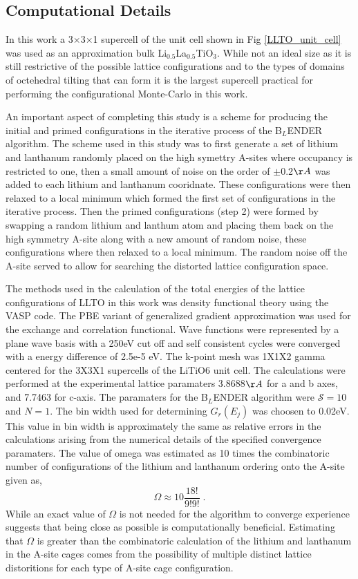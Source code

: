 \documentclass[aps,prl,reprint,superscriptaddress,showkeys]{revtex4-1}
\begin{document}
\subsection{Computational Details}
In this work a 3$\times$3$\times$1 supercell of the unit cell shown in Fig \ref{LLTO_unit_cell} was used as an approximation bulk Li$_{0.5}$La$_{0.5}$TiO$_{3}$. While not an ideal size as it is still restrictive of the possible lattice configurations and to the types of domains of octehedral tilting that can form it is the largest supercell practical for performing the configurational Monte-Carlo in this work. 

An important aspect of completing this study is a scheme for producing the initial and primed configurations in the iterative process of the B$_L$ENDER algorithm. The scheme used in this study was to first generate a set of lithium and lanthanum randomly placed on the high symettry A-sites where occupancy is restricted to one, then a small amount of noise on the order of $\pm$0.2$\AA$ was added to each lithium and lanthanum cooridnate. These configurations were then relaxed to a local minimum which formed the first set of configurations in the iterative process.  Then the primed configurations (step 2) were formed by swapping a random lithium and lanthum atom and placing them back on the high symmetry A-site along with a new amount of random noise, these configurations where then relaxed to a local minimum. The random noise off the A-site served to allow for searching the distorted lattice configuration space. 

The methods used in the calculation of the total energies of the lattice configurations of LLTO in this work was density functional theory using the VASP code. The PBE variant of generalized gradient approximation was used for the exchange and correlation functional.  Wave functions were represented by a plane wave basis with a 250eV cut off and self consistent cycles were converged with a energy difference of 2.5e-5 eV. The k-point mesh was 1X1X2 gamma centered for the 3X3X1 supercells of the LiTiO6 unit cell. The calculations were performed at the experimental lattice paramaters 3.8688$\AA$ for a and b axes, and 7.7463 for c-axis. The paramaters for the B$_L$ENDER algorithm were $\mathcal{S}=10$ and $N=1$. The bin width used for determining $G_r(E_j)$ was choosen to 0.02eV. This value in bin width is approximately the same as relative errors in the calculations arising from the numerical details of the specified convergence paramaters. The value of omega was estimated as 10 times the combinatoric number of configurations of the lithium and lanthanum ordering onto the A-site  given as, 
\begin{equation}
\Omega \approx 10\frac{18!}{9!9!} \;.
\end{equation}
While an exact value of $\Omega$ is not needed for the algorithm to converge experience suggests that being close as possible is computationally beneficial. Estimating that $\Omega$ is greater than the combinatoric calculation of the lithium and lanthanum in the A-site cages comes from the possibility of multiple distinct lattice distoritions for each type of A-site cage configuration. 
\end{document}
